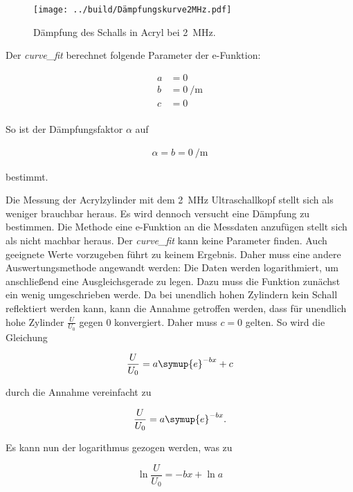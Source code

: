\begin{figure}[H]
    \centering
    \texttt{[image: ../build/Dämpfungskurve2MHz.pdf]}
    \caption{Dämpfung des Schalls in Acryl bei \qty{2}{\mega\hertz}.}
\end{figure}

\noindent Der \emph{curve\_fit} berechnet folgende Parameter der e-Funktion:

\begin{align*}
    a &= \num{0} \\
    b &= \qty{0}{\per \meter} \\
    c &= \num{0} \\
\end{align*}

\noindent So ist der Dämpfungsfaktor $\alpha$ auf 

\begin{align*}
    \alpha = b = \qty{0}{\per \meter}
\end{align*}

\noindent bestimmt.

Die Messung der Acrylzylinder mit dem \qty{2}{\mega\hertz} Ultraschallkopf stellt sich als weniger brauchbar heraus. 
Es wird dennoch versucht eine Dämpfung zu bestimmen. Die Methode eine e-Funktion an die Messdaten anzufügen stellt 
sich als nicht machbar heraus. Der \emph{curve\_fit} kann keine Parameter finden. Auch geeignete Werte vorzugeben 
führt zu keinem Ergebnis. Daher muss eine andere Auswertungsmethode angewandt werden: Die Daten werden logarithmiert, 
um anschließend eine Ausgleichsgerade zu legen. Dazu muss die Funktion zunächst ein wenig umgeschrieben werde. 
Da bei unendlich hohen Zylindern kein Schall reflektiert werden kann, kann die Annahme getroffen werden, dass für 
unendlich hohe Zylinder $\frac{U}{U_0}$ gegen $0$ konvergiert. Daher muss $c=0$ gelten.
So wird die Gleichung 

\begin{equation*}
    \frac{U}{U_0} = a \symup{e} ^{-bx} +c
\end{equation*}

\noindent durch die Annahme vereinfacht  zu

\begin{equation*}
    \frac{U}{U_0} = a \symup{e} ^{-bx}.
\end{equation*}

\noindent Es kann nun der logarithmus gezogen werden, was zu 

\begin{equation*}
    \ln{\frac{U}{U_0}} = {-bx} + \ln{a}
\end{equation*}


